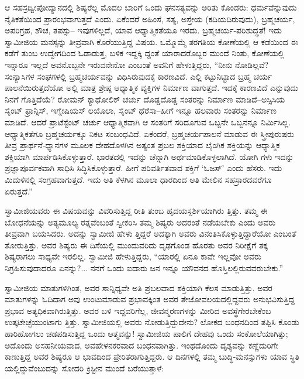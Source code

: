 ಆ ಸಹಸ್ರದ್ವೀಪೋದ್ಯಾನದಲ್ಲಿ ಶಿಷ್ಯರೆಲ್ಲ ಮೊದಲ ಬಾರಿಗೆ ಒಂದು ಘನಸತ್ಯವನ್ನು ಅರಿತು ಕೊಂಡರು: ಧರ್ಮವೆನ್ನುವುದು ನೈತಿಕತೆಯಿಂದ ಪ್ರಾರಂಭವಾಗುತ್ತದೆ ಎಂದು. ಏಕೆಂದರೆ ಅಹಿಂಸೆ, ಸತ್ಯ, ಅಸ್ತೇಯ (ಕದಿಯದಿರುವುದು), ಬ್ರಹ್ಮಚರ್ಯ, ಅಪರಿಗ್ರಹ, ಶೌಚ, ತಪಸ್ಸು– ಇವುಗಳಿಲ್ಲದೆ, ಯಾವ ಆಧ್ಯಾತ್ಮಿಕತೆಯೂ ಇರದು. ಬ್ರಹ್ಮಚರ್ಯ-ಪರಿಶುದ್ಧತೆ! ಇದು ಸ್ವಾಮೀಜಿಯ ಮನಸ್ಸನ್ನು ತೀವ್ರವಾಗಿ ಕೊರೆಯುತ್ತಿದ್ದ ವಿಷಯ. ಒಮ್ಮೊಮ್ಮೆ ತರಗತಿಯ ಕೋಣೆಯಲ್ಲಿ ಆ ಕಡೆಯಿಂದ ಈ ಕಡೆಗೆ ತುಂಬ ಉದ್ವೇಗದಿಂದ ಓಡಾಡುತ್ತ, ಬಳಿಕ ಇದ್ದಕ್ಕಿ ದ್ದಂತೆ ಯಾರಾದರೊಬ್ಬರ ಮುಂದೆ ನಿಂತು, ಕೋಣೆಯಲ್ಲಿ ಇನ್ನಾರೂ ಇಲ್ಲದೆ ಅವನೊಬ್ಬನೇ ಇರುವನೇನೋ ಎಂಬಂತೆ ಅವನಿಗೆ ಹೇಳುತ್ತಿದ್ದರು, “ನೀನು ನೋಡಿಲ್ಲವೆ? ಸಂನ್ಯಾಸಿಗಳ ಸಂಘಗಳಲ್ಲಿ ಬ್ರಹ್ಮಚರ್ಯವನ್ನು ವಿಧಿಸಿರುವುದಕ್ಕೆ ಕಾರಣವಿದೆ. ಎಲ್ಲಿ ಕಟ್ಟುನಿಟ್ಟಾದ ಬ್ರಹ್ಮ ಚರ್ಯ ಪಾಲನೆಯಿರುತ್ತದೆಯೋ ಅಲ್ಲಿ ಮಾತ್ರ ಶ್ರೇಷ್ಠ ಆಧ್ಯಾತ್ಮಿಕ ವ್ಯಕ್ತಿಗಳ ನಿರ್ಮಾಣ ವಾಗುತ್ತದೆ. ಇದಕ್ಕೆ ಕಾರಣವಿದೆ ಎನ್ನುವುದು ನಿನಗೆ ಗೊತ್ತಿದೆಯೆ? ರೋಮನ್ ಕ್ಯಾಥೋಲಿಕ್ ಚರ್ಚು ದೊಡ್ಡದೊಡ್ಡ ಸಂತರನ್ನು ನಿರ್ಮಾಣ ಮಾಡಿದೆ–ಅಸ್ಸಿಸಿಯ ಸೈಂಟ್ ಫ್ರಾನ್ಸಿಸ್, ಇಗ್ನೇಷಿಯಸ್ ಲಯೊಲಾ, ಸೈಂಟ್ ಥೆರೆಸಾ–ಹೀಗೆ ಇನ್ನೂ ಹಲವಾರು ಸಂತರನ್ನು ನಿರ್ಮಾಣ ಮಾಡಿದೆ. ಆದರೆ ಪ್ರಾಟೆಸ್ಟೆಂಟ್ ಚರ್ಚು ಆಧ್ಯಾತ್ಮಿಕವಾಗಿ ಆ ಸಂತರಿಗೆ ಸರಿದೂಗುವ ಒಬ್ಬನೇ ಒಬ್ಬನನ್ನೂ ನಿರ್ಮಿಸಿಲ್ಲ. ಆಧ್ಯಾತ್ಮಿಕತೆಗೂ ಬ್ರಹ್ಮಚರ್ಯಕ್ಕೂ ನಿಕಟ ಸಂಬಂಧವಿದೆ. ಏಕೆಂದರೆ, ಬ್ರಹ್ಮಚರ್ಯಪಾಲನೆ ಮಾಡುವ ಈ ಸ್ತ್ರೀಪುರುಷರು ತೀವ್ರ ಪ್ರಾರ್ಥನೆ-ಧ್ಯಾನಗಳ ಮೂಲಕ ದೇಹದೊಳಗಿನ ಅತ್ಯಂತ ಪ್ರಬಲ ಶಕ್ತಿಯಾದ ಲೈಂಗಿಕ ಶಕ್ತಿಯನ್ನು ಆಧ್ಯಾತ್ಮಿಕ ಶಕ್ತಿಯಾಗಿ ಮಾರ್ಪಡಿಸಿಕೊಳ್ಳುತ್ತಾರೆ. ಭಾರತದಲ್ಲಿ ಇದನ್ನು ಚೆನ್ನಾಗಿ ಅರ್ಥಮಾಡಿಕೊಳ್ಳಲಾಗಿದೆ. ಯೋಗಿ ಗಳು ಇದನ್ನು ಪ್ರಜ್ಞಾಪೂರ್ವಕವಾಗಿ ಸಾಧಿಸಿ ಸಿದ್ಧಿಸಿಕೊಳ್ಳುತ್ತಾರೆ. ಹೀಗೆ ಪರಿವರ್ತಿತವಾದ ಶಕ್ತಿಗೆ ‘ಓಜಸ್​’ ಎಂದು ಹೆಸರು. ಇದು ಮಿದುಳಿನಲ್ಲಿ ಸಂಗ್ರಹವಾಗುತ್ತದೆ. ಇದು ಅತಿ ಕೆಳಗಿನ ಮೂಲಾ ಧಾರದಿಂದ ಅತಿ ಮೇಲಿನ ಸಹಸ್ರಾರದವರೆಗೂ ಏರುತ್ತದೆ.”

ಸ್ವಾಮೀಜಿಯವರು ಈ ವಿಷಯವನ್ನು ವಿವರಿಸುತ್ತಿದ್ದ ರೀತಿ ತುಂಬ ಹೃದಯಸ್ಪರ್ಶಿಯಾಗಿರು ತ್ತಿತ್ತು. ತಮ್ಮ ಈ ಬೋಧನೆಯನ್ನು ಅತ್ಯಮೂಲ್ಯ ರತ್ನವೆಂಬಂತೆ ಸ್ವೀಕರಿಸಿ ತಮ್ಮ ಶಿಷ್ಯರು ಅದರಂತೆ ನಡೆಯಬೇಕು ಎಂದು ಅವರು ತೀವ್ರವಾಗಿ ಬಯಸಿದರು. ಅದನ್ನು ಸ್ವಾಮೀಜಿ ಹೇಳು ತ್ತಿದ್ದರೆ ಅದಕ್ಕಾಗಿ ಅವರು ವಿನಂತಿಸಿಕೊಳ್ಳುತ್ತಿದ್ದಾರೆಯೋ ಎಂಬಂತೆ ತೋರುತ್ತಿತ್ತು. ಅವರ ಶಿಷ್ಯರು ಈ ದಿಸೆಯಲ್ಲಿ ಮುಂದುವರಿದು ದೃಢಗೊಂಡ ಹೊರತು ಅವರ ನಿರೀಕ್ಷೆಗೆ ತಕ್ಕ ಶಿಷ್ಯರಾಗಲು ಸಾಧ್ಯವೇ ಇರಲಿಲ್ಲ. ಸ್ವಾಮೀಜಿ ಹೇಳುತ್ತಿದ್ದರು, “ಯಾರಲ್ಲಿ ಏನೂ ಕಾವೇ ಇಲ್ಲವೋ ಅವರು ನಿಗ್ರಹಿಸುವುದಾದರೂ ಏನನ್ನು?... ನನಗೆ ಒಂದು ಐದಾರು ಜನ ಇನ್ನೂ ಯೌವನದ ಹೊಸ್ತಿಲಲ್ಲಿರುವವರುಬೇಕು.”

ಸ್ವಾಮೀಜಿಯ ಮಾತುಗಳಿಗಿಂತ, ಅವರ ಸಾನ್ನಿಧ್ಯವೇ ಅತಿ ಪ್ರಬಲವಾದ ಶಕ್ತಿಯಾಗಿ ಕೆಲಸ ಮಾಡುತ್ತಿತ್ತು. ಅವರ ಮಾತುಗಳನ್ನು ಓದಿದಾಗ ಅವು ಉಂಟುಮಾಡುವ ಪ್ರಭಾವಕ್ಕಿಂತ ಅವರ ತೇಜೋವಲಯದಲ್ಲಿದ್ದವರು ಅನುಭವಿಸುತ್ತಿದ್ದ ಪ್ರಭಾವ ಅತ್ಯಧಿಕವಾಗಿರುತ್ತಿತ್ತು. ಅವರ ಬಳಿ ಇದ್ದವರಿಗೆಲ್ಲ, ಜೀವನ್ಮರಣಗಳನ್ನು ಮೀರಿದ ಅವಸ್ಥೆಗೇರಬೇಕೆಂಬ ಉತ್ಕಟೇಚ್ಛೆಯುಂಟಾಗು ತ್ತಿತ್ತು. ಸ್ವಾಮೀಜಿಯಲ್ಲಿ ಅವರು ನೋಡುತ್ತಿದ್ದುದೇನು? ಲೋಕದ ಬಂಧನದಿಂದ ತಪ್ಪಿಸಿ ಕೊಂಡು ಹಾರಿಹೋಗಲು ಚಡಪಡಿಸುತ್ತಿದ್ದ ಒಂದು ಆತ್ಮವನ್ನು! ಸ್ವಾಮೀಜಿಯ ಪಾಲಿಗೆ ದೇಹವು ಒಂದು ಸಂಕೋಲೆಯಾಗಿತ್ತು; ಅದೊಂದು ಅಸಹನೀಯವಾದ, ಅವಹೇಳನಕರವಾದ ಬಂಧನವಾಗಿತ್ತು. ಇಂಥದೊಂದು ದೃಶ್ಯವನ್ನು ಕಣ್ಣೆದುರಿಗೇ ಕಾಣುತ್ತಿದ್ದ ಅವರ ಶಿಷ್ಯರೂ ಆ ಭಾವದಿಂದ ಪ್ರೇರಿತರಾಗುತ್ತಿದ್ದರು. ಆ ದಿನಗಳಲ್ಲಿ ತಮ್ಮ ಬುದ್ಧಿ-ಮನಸ್ಸುಗಳು ಯಾವ ಸ್ಥಿತಿ ಯಲ್ಲಿದ್ದುವೆಂಬುದನ್ನು ಸೋದರಿ ಕ್ರಿಸ್ಟೀನ ಮುಂದೆ ಬರೆಯುತ್ತಾಳೆ:

